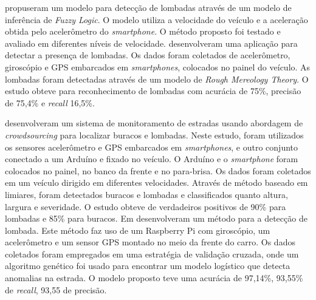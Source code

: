  propuseram um modelo para detecção de lombadas através de um modelo de inferência de \textit{Fuzzy Logic}. O modelo utiliza a velocidade do veículo e a aceleração obtida pelo acelerômetro do \textit{smartphone}. O método proposto foi testado e avaliado em diferentes níveis de velocidade.  desenvolveram uma aplicação para detectar a presença de lombadas. Os dados foram coletados de acelerômetro, giroscópio e GPS embarcados em \textit{smartphones}, colocados no painel do veículo. As lombadas foram detectadas através de um modelo de \textit{Rough Mereology Theory}. O estudo obteve para reconhecimento de lombadas com acurácia de 75\%, precisão de 75,4\% e \textit{recall} 16,5\%.

 desenvolveram um sistema de monitoramento de estradas usando abordagem de \textit{crowdsourcing} para localizar buracos e lombadas. Neste estudo, foram utilizados os sensores acelerômetro e GPS embarcados em \textit{smartphones}, e outro conjunto conectado a um Arduíno e fixado no veículo. O Arduíno e o \textit{smartphone} foram colocados no painel, no banco da frente e no para-brisa. Os dados foram coletados em um veículo dirigido em diferentes velocidades. Através de método baseado em limiares, foram detectados buracos e lombadas e classificados quanto altura, largura e severidade. O estudo obteve de verdadeiros positivos de 90\% para lombadas e 85\% para buracos. Em  desenvolveram um método para a detecção de lombada. Este método faz uso de um Raspberry Pi com giroscópio, um acelerômetro e um sensor GPS montado no meio da frente do carro. Os dados coletados foram empregados em uma estratégia de validação cruzada, onde um algoritmo genético foi usado para encontrar um modelo logístico que detecta anomalias na estrada. O modelo proposto teve uma acurácia de 97,14\%, 93,55\% de \textit{recall}, 93,55 de precisão.

